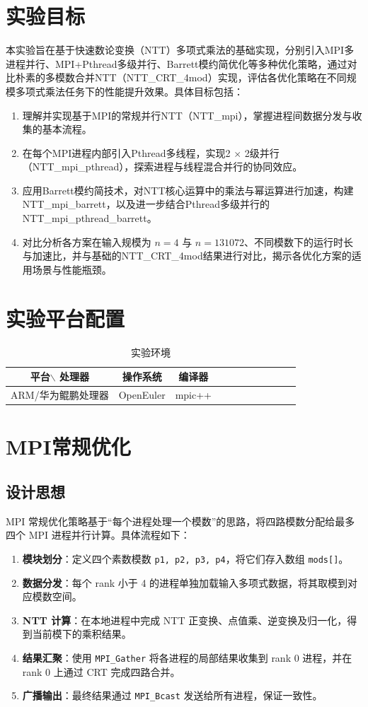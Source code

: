 \documentclass[a4paper]{article}
\begin{document}
\section{实验目标}
本实验旨在基于快速数论变换（NTT）多项式乘法的基础实现，分别引入MPI多进程并行、MPI+Pthread多级并行、Barrett模约简优化等多种优化策略，通过对比朴素的多模数合并NTT（NTT\_CRT\_4mod）实现，评估各优化策略在不同规模多项式乘法任务下的性能提升效果。具体目标包括：
\begin{enumerate}[1.]
	\item 理解并实现基于MPI的常规并行NTT（NTT\_mpi），掌握进程间数据分发与收集的基本流程。
	\item 在每个MPI进程内部引入Pthread多线程，实现2 \(\times\) 2级并行（NTT\_mpi\_pthread），探索进程与线程混合并行的协同效应。
	\item 应用Barrett模约简技术，对NTT核心运算中的乘法与幂运算进行加速，构建NTT\_mpi\_barrett，以及进一步结合Pthread多级并行的NTT\_mpi\_pthread\_barrett。
	\item 对比分析各方案在输入规模为 \(n=4\) 与 \(n=131072\)、不同模数下的运行时长与加速比，并与基础的NTT\_CRT\_4mod结果进行对比，揭示各优化方案的适用场景与性能瓶颈。
\end{enumerate}
\section{实验平台配置}
\begin{table}[!htbp]
	\centering
	\begin{tabular}{ccccccccccc}
		\toprule  
		平台$\backslash$ 处理器& 操作系统& 编译器\\
		\midrule
		ARM/华为鲲鹏处理器& OpenEuler& mpic++\\
		\bottomrule
	\end{tabular}
	\caption{实验环境}
	\label{table:t1}
\end{table}
\section{MPI常规优化}
\subsection{设计思想}
MPI 常规优化策略基于“每个进程处理一个模数”的思路，将四路模数分配给最多四个 MPI 进程并行计算。具体流程如下：
\begin{enumerate}
	\item \textbf{模块划分}：定义四个素数模数 \texttt{p1, p2, p3, p4}，将它们存入数组 \texttt{mods[]}。
	\item \textbf{数据分发}：每个 rank 小于 4 的进程单独加载输入多项式数据，将其取模到对应模数空间。
	\item \textbf{NTT 计算}：在本地进程中完成 NTT 正变换、点值乘、逆变换及归一化，得到当前模下的乘积结果。
	\item \textbf{结果汇聚}：使用 \texttt{MPI\_Gather} 将各进程的局部结果收集到 rank 0 进程，并在 rank 0 上通过 CRT 完成四路合并。
	\item \textbf{广播输出}：最终结果通过 \texttt{MPI\_Bcast} 发送给所有进程，保证一致性。
\end{enumerate}
\end{document}
